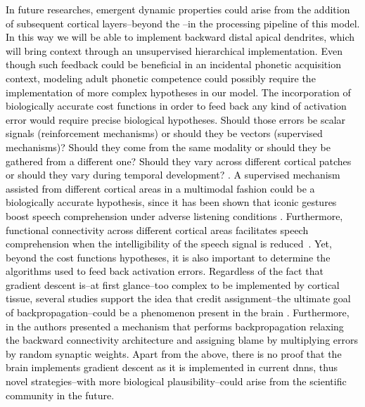 \documentclass[10pt,letterpaper]{article}
\newcommand{\reviewerfour}[1]{\textcolor{black}{#1}}
\newcommand{\reviewerfive}[1]{\textcolor{black}{#1}}
\begin{document}
\reviewerfour{In future researches, emergent dynamic properties could arise from the addition of subsequent cortical layers--beyond the \glsfirst{el}--in the processing pipeline of this model.  In this way we will be able to implement backward distal apical dendrites, which will bring context through an unsupervised hierarchical implementation. Even though such feedback could be beneficial in an incidental phonetic acquisition context, modeling adult phonetic competence could possibly require the implementation of more complex hypotheses in our model. The incorporation of biologically accurate cost functions in order to feed back any kind of activation error would require precise biological hypotheses. Should those errors be scalar signals (reinforcement mechanisms) or should they be vectors (supervised mechanisms)? Should they come from the same modality or should they be gathered from a different one? Should they vary across different cortical patches or should they vary during temporal development? \cite{10.3389/fncom.2016.00094}. \reviewerfive{A supervised mechanism assisted from different cortical areas in a multimodal fashion could be a biologically accurate hypothesis, since it has been shown that iconic gestures boost speech comprehension under adverse listening conditions \cite{HOLLE2010875}. Furthermore, functional connectivity across different cortical areas facilitates speech comprehension when the intelligibility of the speech signal is reduced~\cite{Obleser2283}}. Yet, beyond the cost functions hypotheses, it is also important to determine the algorithms used to feed back activation errors. Regardless of the fact that gradient descent is--at first glance--too complex to be implemented by cortical tissue, several studies support the idea that credit assignment--the ultimate goal of backpropagation--could be a phenomenon present in the brain \cite{Guerguiev2017TowardsDL}. Furthermore, in \cite{Lillicrap_2016} the authors presented a mechanism that performs backpropagation relaxing the backward connectivity architecture and assigning blame by multiplying errors by random synaptic weights. Apart from the above, there is no proof that the brain implements gradient descent as it is implemented in current \glspl{dnn}, thus novel strategies--with more biological plausibility--could arise from the scientific community in the future}.
\end{document}
